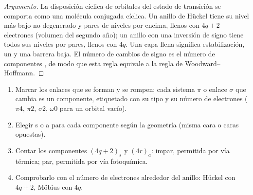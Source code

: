 \begin{proof}[Argumento]
La disposición cíclica de orbitales del estado de transición se comporta como una molécula
conjugada cíclica. Un anillo de Hückel tiene su nivel más bajo no degenerado y pares de niveles
por encima, llenos con $4q + 2$ electrones (volumen del segundo año); un anillo con una inversión de
signo tiene todos sus niveles por pares, llenos con $4q$. Una capa llena significa
estabilización, un  y una barrera baja. El número de cambios
de signo es el número de componentes , de modo que esta regla equivale a la
regla de Woodward--Hoffmann.
\end{proof}

\begin{method}\label{met:b3:pericyclic:components}
\begin{enumerate}
  \item Marcar los enlaces que se forman y se rompen; cada sistema $\pi$ o enlace $\sigma$ que cambia es un
        componente, etiquetado con su tipo y su número de electrones ($\pi4$, $\pi2$, $\sigma2$, $\omega0$ para
        un orbital vacío).
  \item Elegir s o a para cada componente según la geometría (misma cara o
        caras opuestas).
  \item Contar los componentes $(4q + 2)_s$ y $(4r)_a$: impar, permitida por vía térmica; par, permitida
        por vía fotoquímica.
  \item Comprobarlo con el número de electrones alrededor del anillo: Hückel con $4q + 2$,
        Möbius con $4q$.
\end{enumerate}
\end{method}

